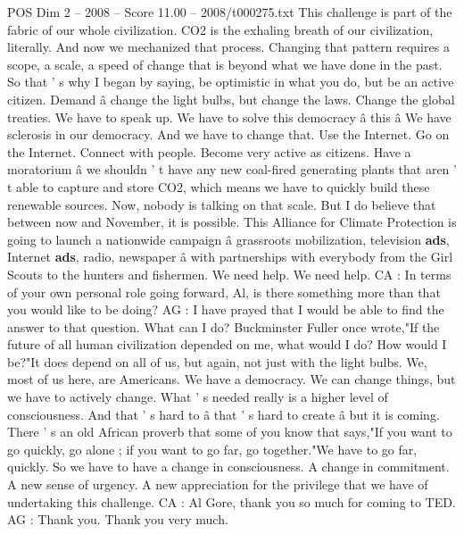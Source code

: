 \begin{textsample}{POS Dim 2 – 2008 – Score 11.00 – 2008/t000275.txt}
This challenge is part of the fabric of our whole civilization.
CO2 is the exhaling breath of our civilization, literally.
And now we mechanized that process.
Changing that pattern requires a scope, a scale, a speed of change that is beyond what we have done in the past.
So that ' s why I began by saying, be optimistic in what you do, but be an active citizen.
Demand â change the light bulbs, but change the laws.
Change the global treaties.
We have to speak up.
We have to solve this democracy â this â We have sclerosis in our democracy.
And we have to change that.
Use the Internet.
Go on the Internet.
Connect with people.
Become very active as citizens.
Have a moratorium â we shouldn ' t have any new coal-fired generating plants that aren ' t able to capture and store CO2, which means we have to quickly build these renewable sources.
Now, nobody is talking on that scale.
But I do believe that between now and November, it is possible.
This Alliance for Climate Protection is going to launch a nationwide campaign â grassroots mobilization, television \textbf{ads}, Internet \textbf{ads}, radio, newspaper â with partnerships with everybody from the Girl Scouts to the hunters and fishermen.
We need help.
We need help.
CA : In terms of your own personal role going forward, Al, is there something more than that you would like to be doing?
AG : I have prayed that I would be able to find the answer to that question.
What can I do?
Buckminster Fuller once wrote,"If the future of all human civilization depended on me, what would I do?
How would I be?"It does depend on all of us, but again, not just with the light bulbs.
We, most of us here, are Americans.
We have a democracy.
We can change things, but we have to actively change.
What ' s needed really is a higher level of consciousness.
And that ' s hard to â that ' s hard to create â but it is coming.
There ' s an old African proverb that some of you know that says,"If you want to go quickly, go alone ; if you want to go far, go together."We have to go far, quickly.
So we have to have a change in consciousness.
A change in commitment.
A new sense of urgency.
A new appreciation for the privilege that we have of undertaking this challenge.
CA : Al Gore, thank you so much for coming to TED.
AG : Thank you.
Thank you very much.

\end{textsample}
